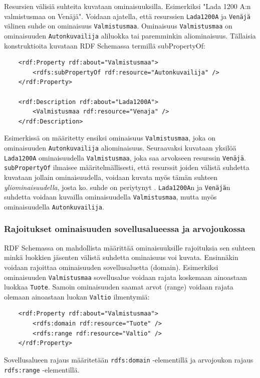 \documentclass[finnish]{tktltiki2}
\theoremstyle{definition}
\theoremstyle{remark}
\begin{document}
Resursien välisiä suhteita kuvataan ominaisuuksilla. Esimerkiksi "Lada 1200 A:n valmistusmaa on Venäjä". Voidaan ajatella, että resurssien \texttt{Lada1200A} ja \texttt{Venäjä} välinen suhde on ominaisuus \texttt{Valmistusmaa}. Ominaisuus \texttt{Valmistusmaa} on ominaisuuden \texttt{Autonkuvailija}  aliluokka tai paremminkin aliominaisuus. Tällaisia konstruktioita kuvataan RDF Schemassa termillä subPropertyOf: 
\begin{verbatim}
    <rdf:Property rdf:about="Valmistusmaa">
        <rdfs:subPropertyOf rdf:resource="Autonkuvailija" />
    </rdf:Property>

    <rdf:Description rdf:about="Lada1200A">
        <Valmistusmaa rdf:resource="Venaja" />
    </rdf:Description>
\end{verbatim}
Esimerkissä on määritetty ensiksi ominaisuus \texttt{Valmistusmaa}, joka on ominaisuuden \texttt{Autonkuvailija} aliominaisuus. Seuraavaksi kuvataan yksilöä \texttt{Lada1200A} ominaisuudella \texttt{Valmistusmaa}, joka saa arvokseen resurssin \texttt{Venäjä}. \texttt{subPropertyOf} ilmaisee määritelmällisesti, että resurssit joiden välistä suhdetta kuvataan jollain ominaisuudella, voidaan kuvata myös tämän suhteen \textit{yliominaisuudella}, josta ko. suhde on periytynyt \cite{RDFS}. \texttt{Lada1200A}n ja \texttt{Venäjä}n suhdetta voidaan kuvailla ominaisuudella \texttt{Valmistusmaa}, mutta myös ominaisuudella \texttt{Autonkuvailija}. 

\subsubsection{Rajoitukset ominaisuuden sovellusalueessa ja arvojoukossa}
RDF Schemassa on mahdollista määrittää ominaisuuksille rajoituksia sen suhteen minkä luokkien jäsenten välistä suhdetta ominaisuus voi kuvata. Ensinnäkin
voidaan rajoittaa ominaisuuden sovellusaluetta (domain). Esimerkiksi ominaisuuden  \texttt{Valmistusmaa} sovellusalue voidaan rajata koskemaan ainoastaan luokkaa \texttt{Tuote}. Samoin 
ominaisuuden saamat arvot (range) voidaan rajata olemaan ainoastaan luokan \texttt{Valtio} ilmentymiä: 
\begin{verbatim}
    <rdf:Property rdf:about="Valmistusmaa">
        <rdfs:domain rdf:resource="Tuote" />
        <rdfs:range rdf:resource="Valtio" />
    </rdf:Property>
\end{verbatim}
Sovellusalueen rajaus määritetään \texttt{rdfs:domain} -elementillä ja arvojoukon rajaus \texttt{rdfs:range} -elementillä.  
\end{document}
